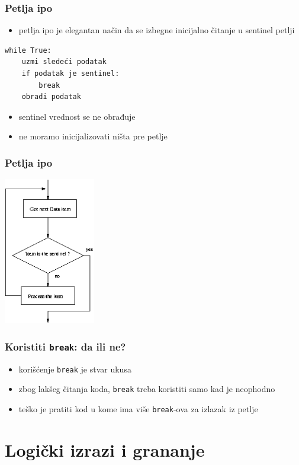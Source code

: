 \documentclass[utf8,compress]{beamer}
\begin{document}
\begin{frame}[fragile]
  \frametitle{Petlja ipo}
  \begin{itemize}
    \item petlja ipo je elegantan način da se izbegne inicijalno čitanje u sentinel petlji
  \end{itemize}
\begin{verbatim}
while True:
    uzmi sledeći podatak
    if podatak je sentinel: 
        break
    obradi podatak
\end{verbatim}
  \begin{itemize}
    \item sentinel vrednost se ne obrađuje
    \item ne moramo inicijalizovati ništa pre petlje
  \end{itemize}
\end{frame}

\begin{frame}[fragile]
  \frametitle{Petlja ipo}
  \begin{center}
    \includegraphics[width=4cm]{pic21}
  \end{center}
\end{frame}

\begin{frame}[fragile]
  \frametitle{Koristiti \texttt{break}: da ili ne?}
  \begin{itemize}
    \item korišćenje \texttt{break} je stvar ukusa
    \item zbog lakšeg čitanja koda, \texttt{break} treba koristiti samo kad je neophodno
    \item teško je pratiti kod u kome ima više \texttt{break}-ova za izlazak iz petlje
  \end{itemize}
\end{frame}

\section[Logički izrazi]{Logički izrazi i grananje}
\end{document}
